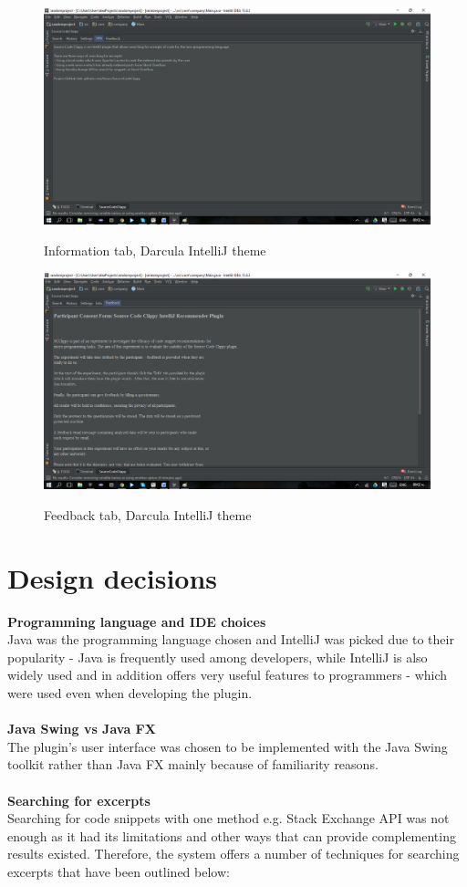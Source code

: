 \documentclass{l4proj}
\begin{document}
\begin{figure}[h]
\caption{Information tab, Darcula IntelliJ theme}
\includegraphics[scale=0.2]{tab-info}
\centering
\label{fig:info-tab}
\end{figure}

\begin{figure}[h]
\caption{Feedback tab, Darcula IntelliJ theme}
\includegraphics[scale=0.2]{tab-feedback}
\centering
\label{fig:feedback-tab}
\end{figure}

\section{Design decisions}

\textbf{Programming language and IDE choices}\\
Java was the programming language chosen and IntelliJ was picked due to their popularity - Java is frequently used among developers, while IntelliJ is also widely used and in addition offers very useful features to programmers - which were used even when developing the plugin.
\\
\\
\textbf{Java Swing vs Java FX}\\
The plugin's user interface was chosen to be implemented with the Java Swing toolkit rather than Java FX mainly because of familiarity reasons.
\\
\\
\textbf{Searching for excerpts}\\
Searching for code snippets with one method e.g. Stack Exchange API was not enough as it had its limitations and other ways that can provide complementing results existed. Therefore, the system offers a number of techniques for searching excerpts that have been outlined below:
\end{document}
